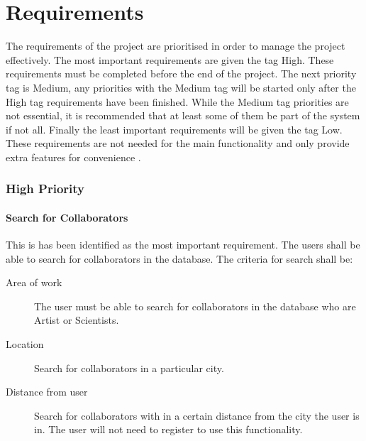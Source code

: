 \documentclass[a4paper,oneside,11pt]{report}
\begin{document}

\chapter{Requirements}
The requirements of the project are prioritised in order to manage the project effectively. The most important requirements are given the tag High. These requirements must be completed before the end of the project. The next priority tag is Medium, any priorities with the Medium tag will be started only after the High tag requirements have been finished. While the Medium tag priorities are not essential, it is recommended that at least some of them be part of the system if not all. Finally the least important requirements will be given the tag Low. These requirements are not needed for the main functionality and only provide extra features for convenience .

\subsection{High Priority}
\subsubsection{Search for Collaborators} 
This is has been identified as the most important requirement. The users shall be able to search for collaborators in the database. The criteria for search shall be:
\begin{description}
	\item[Area of work] The user must be able to search for collaborators in the database who are Artist or Scientists.
	\item[Location] Search for collaborators in a particular city.
	\item[Distance from user] Search for collaborators with in a certain distance from the city the user is in. The user will not need to register to use this functionality.
\end{description}
	
\end{document}
